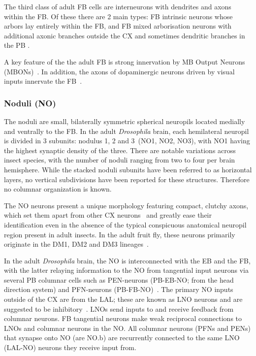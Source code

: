         The third class of adult FB cells are interneurons with dendrites and axons within the FB.
        Of these there are 2 main types: FB intrinsic neurons whose arbors lay entirely within the FB, and FB mixed arborisation neurons with additional axonic branches outside the CX and sometimes dendritic branches in the PB \citep{wolff2015neuroarchitecture}.

        A key feature of the the adult FB is strong innervation by MB Output Neurons (MBONs)~\citep{scheffer2020connectome, hulse2021connectome}. %
        In addition, the axons of dopaminergic neurons driven by visual inputs innervate the FB~\citep{lin2013comprehensive}.
        \subsubsection{Noduli (NO)}
        The noduli are small, bilaterally symmetric spherical neuropils located medially and ventrally to the FB. In the adult \textit{Drosophila} brain, each hemilateral neuropil is divided in 3 subunits: nodulus 1, 2 and 3~(NO1, NO2, NO3), with NO1 having the highest synaptic density of the three. There are notable variations across insect species, with the number of noduli ranging from two to four per brain hemisphere.
        While the stacked noduli subunits have been referred to as horizontal layers, no vertical subdivisions have been reported for these structures. Therefore no columnar organization is known.

        The NO neurons present a unique morphology featuring compact, clutchy axons, which set them apart from other CX neurons~\citep{wolff2018neuroarchitecture, hulse2021connectome} and greatly ease their identification even in the absence of the typical conspicuous anatomical neuropil region present in adult insects. In the adult fruit fly, these neurons primarily originate in the DM1, DM2 and DM3 lineages~\citep{andrade2019developmentally}.


        In the adult \textit{Drosophila} brain, the NO is interconnected with the EB and the FB, with the latter relaying information to the NO from tangential input neurons via several PB columnar cells such as PEN-neurons (PB-EB-NO; from the head direction system) and PFN-neurons (PB-FB-NO)~\citep{wolff2015neuroarchitecture, hulse2021connectome}.
        The primary NO inputs outside of the CX are from the LAL; these are known as LNO neurons and are suggested to be inhibitory~\citep{wolff2018neuroarchitecture, hulse2021connectome}.
        LNOs send inputs to and receive feedback from columnar neurons. %
        FB tangential neurons make weak reciprocal connections to LNOs and columnar neurons in the NO.
        All columnar neurons (PFNs and PENs) that synapse onto NO (are NO.b) are recurrently connected to the same LNO (LAL-NO) neurons they receive input from. 
